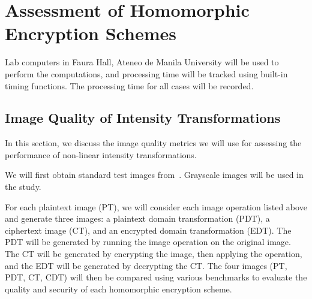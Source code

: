 


\section{Assessment of Homomorphic Encryption Schemes}

Lab computers in Faura Hall, Ateneo de Manila University will be used to perform the computations, and processing time will be tracked using built-in timing functions.
The processing time for all cases will be recorded.

\subsection{Image Quality of Intensity Transformations}
In this section, we discuss the image quality metrics we will use for assessing the performance of non-linear intensity transformations.

We will first obtain standard test images from~\cite{gonzalez_image_nodate}. Grayscale images will be used in the study.

For each plaintext image (PT), we will consider each image operation listed above and generate three images: a plaintext domain transformation (PDT), a ciphertext image (CT), and an encrypted domain transformation (EDT). The PDT will be generated by running the image operation on the original image. The CT will be generated by encrypting the image, then applying the operation, and the EDT will be generated by decrypting the CT. The four images (PT, PDT, CT, CDT) will then be compared using various benchmarks to evaluate the quality and security of each homomorphic encryption scheme.

